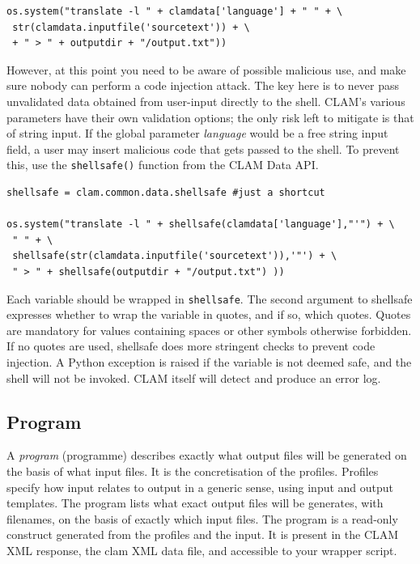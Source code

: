 \documentclass[a4paper,12pt,twoside,openright]{report}
\begin{document}
{ \small
\begin{verbatim}
os.system("translate -l " + clamdata['language'] + " " + \
 str(clamdata.inputfile('sourcetext')) + \
 + " > " + outputdir + "/output.txt"))
\end{verbatim}
}


However, at this point you need to be aware of possible malicious use, and make
sure nobody can perform a code injection attack. The key here is to never pass
unvalidated data obtained from user-input directly to the shell. CLAM's various
parameters have their own validation options; the only risk left to mitigate is
that of string input. If the global parameter \emph{language} would be a free
string input field, a user may insert malicious code that gets passed to the
shell. To prevent this, use the \texttt{shellsafe()} function from the CLAM
Data API. 


{ \small
\begin{verbatim}
shellsafe = clam.common.data.shellsafe #just a shortcut

os.system("translate -l " + shellsafe(clamdata['language'],"'") + \
 " " + \
 shellsafe(str(clamdata.inputfile('sourcetext')),'"') + \
 " > " + shellsafe(outputdir + "/output.txt") ))
\end{verbatim}
}

Each variable should be wrapped in \texttt{shellsafe}. The second argument to
shellsafe expresses whether to wrap the variable in quotes, and if so, which
quotes. Quotes are mandatory for values containing spaces or other symbols
otherwise forbidden. If no quotes are used, shellsafe does more stringent
checks to prevent code injection. A Python exception is raised if the variable
is not deemed safe, and the shell will not be invoked. CLAM itself will detect
and produce an error log.

\subsection{Program}

A \emph{program} (programme) describes exactly what output files will be
generated on the basis of what input files. It is the concretisation of the
profiles. Profiles specify how input relates to output in a generic sense,
using input and output templates. The program lists what exact output files
will be generates, with filenames, on the basis of exactly which input files.
The program is a read-only construct generated from the profiles and the input.
It is present in the CLAM XML response, the clam XML data file, and accessible
to your wrapper script.
\end{document}
